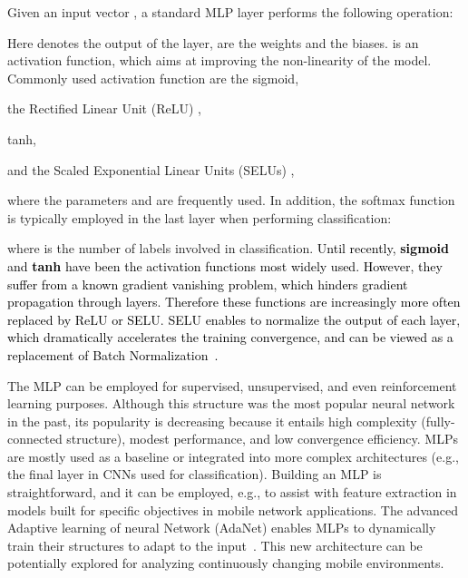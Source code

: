 \documentclass[journal,comsoc,letter]{IEEEtran}
\newcommand{\rev}[1]{\textcolor{black}{#1}}
\begin{document}
Given an input vector , a standard MLP layer performs the following operation:

Here  denotes the output of the layer,  are the weights and  the biases.  is an activation function, which aims at improving the non-linearity of the model. Commonly used activation function are the sigmoid,

the Rectified Linear Unit (ReLU) \cite{glorot2011deep},

tanh,

and the Scaled Exponential Linear Units (SELUs) \cite{klambauer2017self}, 
 
where the parameters  and   are frequently used. In addition, the softmax function is typically employed in the last layer when performing classification:

where  is the number of labels involved in classification. \rev{Until recently, \textbf{sigmoid} and \textbf{tanh} have been the activation functions most widely used. However, they suffer from a known gradient vanishing problem, which hinders gradient propagation through layers. Therefore these functions are increasingly more often replaced by ReLU or SELU. SELU enables to normalize the output of each layer, which dramatically accelerates the training convergence, and can be viewed as a replacement of Batch Normalization~\cite{ioffe2015batch}.}

The MLP can be employed for supervised, unsupervised, and even reinforcement learning purposes. Although this structure was the most popular neural network in the past, its popularity is decreasing because it entails high complexity (fully-connected structure), modest performance, and low convergence efficiency. MLPs are mostly used as a baseline or integrated into more complex architectures (e.g., the final layer in CNNs used for classification). Building an MLP is straightforward, and it can be employed, e.g., to assist with feature extraction in models built for specific objectives in mobile network applications. The advanced Adaptive learning of neural Network (AdaNet) enables MLPs to dynamically train their structures to adapt to the input~\cite{cortes2017adanet}. This new architecture can be potentially explored for analyzing continuously changing mobile environments.
\end{document}

